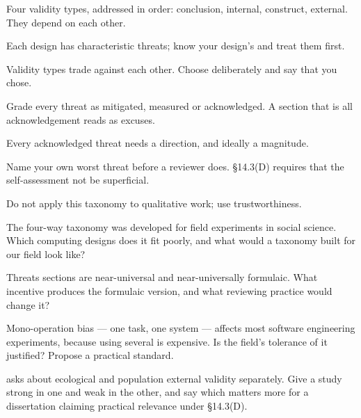 \begin{chaptersummary}
\begin{tight}
  \item Four validity types, addressed in order: conclusion, internal,
    construct, external. They depend on each other.
  \item Each design has characteristic threats; know your design's and treat
    them first.
  \item Validity types trade against each other. Choose deliberately and say
    that you chose.
  \item Grade every threat as mitigated, measured or acknowledged. A section
    that is all acknowledgement reads as excuses.
  \item Every acknowledged threat needs a direction, and ideally a magnitude.
  \item Name your own worst threat before a reviewer does. \S14.3(D) requires
    that the self-assessment not be superficial.
  \item Do not apply this taxonomy to qualitative work; use trustworthiness.
\end{tight}
\end{chaptersummary}

\begin{reviewq}
  \item The four-way taxonomy was developed for field experiments in social
    science. Which computing designs does it fit poorly, and what would a
    taxonomy built for our field look like?
  \item Threats sections are near-universal and near-universally
    formulaic. What incentive produces the formulaic version, and what
    reviewing practice would change it?
  \item Mono-operation bias --- one task, one system --- affects most software
    engineering experiments, because using several is expensive. Is the field's
    tolerance of it justified? Propose a practical standard.
  \item {} asks about ecological and population
    external validity separately. Give a study strong in one and weak in the
    other, and say which matters more for a dissertation claiming practical
    relevance under \S14.3(D).
\end{reviewq}
